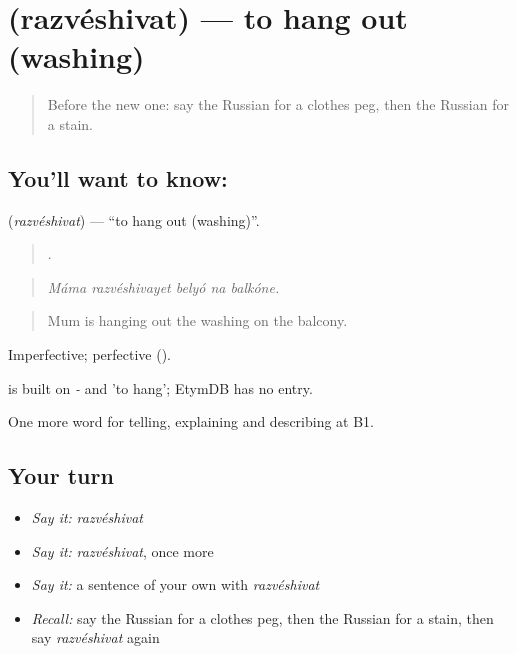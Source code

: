 \section[\texorpdfstring{\ru{развешивать} (razvéshivat)}{развешивать (razvéshivat)}]{ (razvéshivat) — to hang out (washing)}

\label{lesson:RU-C530-razveshivat}



\begin{quote}
Before the new one: say the Russian for a clothes peg, then the Russian for a stain.
\end{quote}

\subsection*{You'll want to know: }
\textbf{} (\emph{razvéshivat}) — \textquotedblleft{}to hang out (washing)\textquotedblright{}.

\begin{quote}
    .
\end{quote}

\begin{quote}
\emph{Máma razvéshivayet belyó na balkóne.}
\end{quote}

\begin{quote}
Mum is hanging out the washing on the balcony.
\end{quote}

Imperfective; perfective  ().

\begin{cousinweb}
\emph{} is built on \emph{-} and \emph{} 'to hang'; EtymDB has no entry.
\end{cousinweb}

\begin{grammarlens}[title={What you've built}]
One more word for telling, explaining and describing at B1.
\end{grammarlens}

\subsection*{Your turn}
\begin{itemize}
\raggedright
  \item \emph{Say it:} \emph{razvéshivat}
  \item \emph{Say it:} \emph{razvéshivat}, once more
  \item \emph{Say it:} a sentence of your own with \emph{razvéshivat}
  \item \emph{Recall:} say the Russian for a clothes peg, then the Russian for a stain, then say \emph{razvéshivat} again
\end{itemize}

